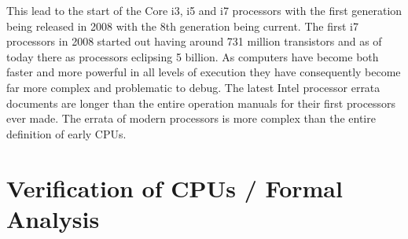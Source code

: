 This lead to the start of the Core i3, i5 and i7 processors with the first generation being released in 2008 with the 8th generation being current. The first i7 processors in 2008 started out having around 731 million transistors and as of today there as processors eclipsing 5 billion.  
	As computers have become both faster and more powerful in all levels of execution they have consequently become far more complex and problematic to debug. The latest Intel processor errata documents are longer than the entire operation manuals for their first processors ever made. The errata of modern processors is more complex than the entire definition of early CPUs.


\section{Verification of CPUs / Formal Analysis}

